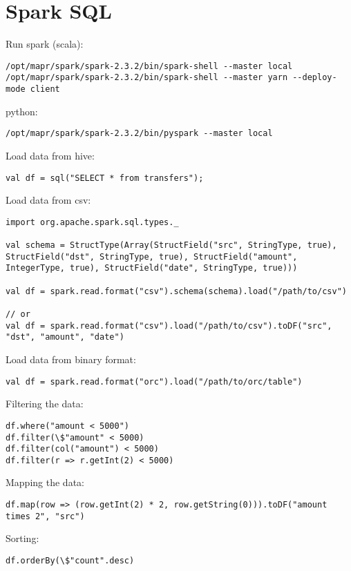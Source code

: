 \documentclass{article}
\begin{document}
\section*{Spark SQL}

Run spark (scala):
\begin{lstlisting}[]
/opt/mapr/spark/spark-2.3.2/bin/spark-shell --master local
/opt/mapr/spark/spark-2.3.2/bin/spark-shell --master yarn --deploy-mode client
\end{lstlisting}

python:
\begin{lstlisting}[]
/opt/mapr/spark/spark-2.3.2/bin/pyspark --master local
\end{lstlisting}

Load data from hive:
\begin{lstlisting}[]
val df = sql("SELECT * from transfers");
\end{lstlisting}

Load data from csv:
\begin{lstlisting}[]
import org.apache.spark.sql.types._

val schema = StructType(Array(StructField("src", StringType, true), StructField("dst", StringType, true), StructField("amount", IntegerType, true), StructField("date", StringType, true)))

val df = spark.read.format("csv").schema(schema).load("/path/to/csv")

// or
val df = spark.read.format("csv").load("/path/to/csv").toDF("src", "dst", "amount", "date")
\end{lstlisting}

Load data from binary format:
\begin{lstlisting}[]
val df = spark.read.format("orc").load("/path/to/orc/table")
\end{lstlisting}

Filtering the data:
\begin{lstlisting}[]
df.where("amount < 5000")
df.filter(\$"amount" < 5000)
df.filter(col("amount") < 5000)
df.filter(r => r.getInt(2) < 5000)
\end{lstlisting}

Mapping the data:
\begin{lstlisting}[]
df.map(row => (row.getInt(2) * 2, row.getString(0))).toDF("amount times 2", "src")
\end{lstlisting}

Sorting:
\begin{lstlisting}[]
df.orderBy(\$"count".desc)
\end{lstlisting}
\end{document}
